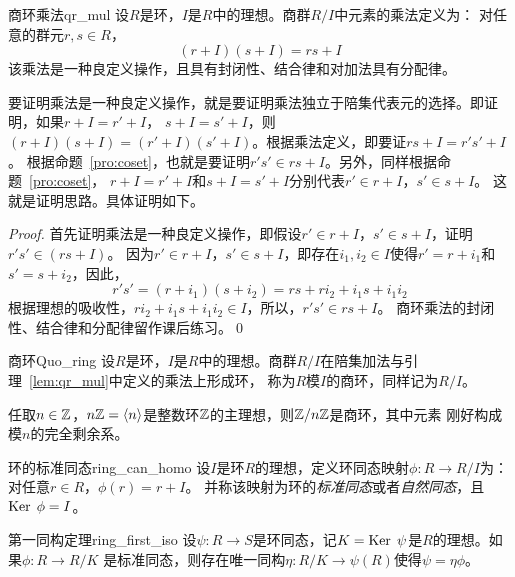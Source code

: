\begin{lemma}{商环乘法}{qr_mul}
设$R$是环，$I$是$R$中的理想。商群$R/I$中元素的乘法定义为：
对任意的群元$r, s\in R$，
\[(r + I)(s +I) = rs + I\]
该乘法是一种良定义操作，且具有封闭性、结合律和对加法具有分配律。
\end{lemma}
要证明乘法是一种良定义操作，就是要证明乘法独立于陪集代表元的选择。即证明，如果$r + I = r' + I$，
$s + I = s' + I$，则$(r + I)(s + I) = (r'+ I)(s' + I) $。根据乘法定义，即要证$rs+ I = r's' + I$。
根据命题~\ref{pro:coset}，也就是要证明$r's' \in rs + I$。另外，同样根据命题~\ref{pro:coset}，
$r + I = r' + I$和$s + I = s' + I$分别代表$r' \in r + I$，$s' \in s + I$。
这就是证明思路。具体证明如下。
\begin{proof}
首先证明乘法是一种良定义操作，即假设$r' \in r + I$，$s' \in s + I$，证明$r's' \in (rs + I)$。
因为$r' \in r + I$，$s' \in s + I$，即存在$i_1, i_2 \in I$使得$r' = r + i_1$和$s' = s + i_2$，因此，
\[ r' s' = (r + i_1) (s + i_2) = rs + r i_2 + i_1 s + i_1 i_2\]
根据理想的吸收性，$r i_2 + i_1 s + i_1 i_2 \in I$，所以，$r's' \in rs + I $。
商环乘法的封闭性、结合律和分配律留作课后练习。\qed
\end{proof}

\begin{theorem}{商环}{Quo_ring}
设$R$是环，$I$是$R$中的理想。商群$R/I$在陪集加法与引理~\ref{lem:qr_mul}中定义的乘法上形成环，
称为$R$模$I$的商环，同样记为$R/I$。
\end{theorem}

\begin{example}
\label{exm:quo_ring}
任取$n \in {\mathbb Z}$，$n{\mathbb Z} = \langle n \rangle$是整数环${\mathbb Z}$的主理想，则${\mathbb Z} / n {\mathbb Z}$是商环，其中元素
刚好构成模$n$的完全剩余系。
\end{example}

\begin{definition}{环的标准同态}{ring_can_homo}
		设$I$是环$R$的理想，定义环同态映射$\phi\colon R \to R / I$为：对任意$r \in R$，$\phi(r) = r + I$。
    并称该映射为环的\emph{标准同态}或者\emph{自然同态}，且$\operatorname{Ker}\; \phi = I$。 
\end{definition}

\begin{theorem}{第一同构定理}{ring_first_iso}
设$\psi\colon R \to S$是环同态，记$K= \operatorname{Ker}\; \psi$是$R$的理想。如果$\phi\colon R \to R/K$
是标准同态，则存在唯一同构$\eta\colon R/K \to \psi(R)$使得$\psi = \eta \phi$。
\end{theorem}

